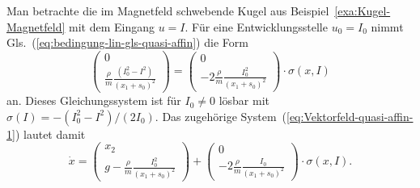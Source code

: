 \begin{example}
\label{exa:Kugel-Magnet-quasi-affine}Man betrachte die im Magnetfeld
schwebende Kugel aus Beispiel~\ref{exa:Kugel-Magnetfeld} mit dem
Eingang $u=I$. Für eine Entwicklungsstelle $u_{0}=I_{0}$ nimmt Gls.~(\ref{eq:bedingung-lin-gls-quasi-affin})
die Form
\[
\left(\begin{array}{c}
0\\
\frac{\rho}{m}\frac{\left(I_{0}^{2}-I^{2}\right)}{(x_{1}+s_{0})^{2}}
\end{array}\right)=\left(\begin{array}{c}
0\\
-2\frac{\rho}{m}\frac{I_{0}^{2}}{(x_{1}+s_{0})^{2}}
\end{array}\right)\cdot\sigma(x,I)
\]
an. Dieses Gleichungssystem ist für $I_{0}\neq0$ lösbar mit $\sigma(I)=-(I_{0}^{2}-I^{2})/(2I_{0})$.
Das zugehörige System~(\ref{eq:Vektorfeld-quasi-affin-1}) lautet
damit 
\[
\dot{x}=\left(\begin{array}{c}
x_{2}\\
g-\frac{\rho}{m}\frac{I_{0}^{2}}{(x_{1}+s_{0})^{2}}
\end{array}\right)+\left(\begin{array}{c}
0\\
-2\frac{\rho}{m}\frac{I_{0}}{(x_{1}+s_{0})^{2}}
\end{array}\right)\cdot\sigma(x,I).
\]
\end{example}

